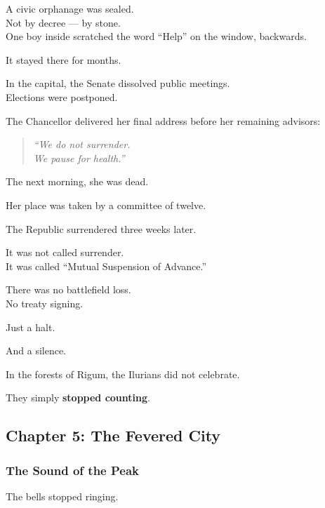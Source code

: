 \documentclass[12pt]{article}
\begin{document}
A civic orphanage was sealed.\\
Not by decree — by stone.\\
One boy inside scratched the word “Help” on the window, backwards.

It stayed there for months.

\vspace{1em}

In the capital, the Senate dissolved public meetings.\\
Elections were postponed.

The Chancellor delivered her final address before her remaining advisors:

\begin{quote}
\textit{“We do not surrender.}\\
\textit{We pause for health.”}
\end{quote}

The next morning, she was dead.

Her place was taken by a committee of twelve.

\vspace{1em}

The Republic surrendered three weeks later.

It was not called surrender.\\
It was called “Mutual Suspension of Advance.”

There was no battlefield loss.\\
No treaty signing.

Just a halt.

And a silence.

\vspace{1em}

In the forests of Rigum, the Ilurians did not celebrate.

They simply \textbf{stopped counting}.

\newpage

\subsection{Chapter 5: The Fevered City}

\vspace{.5in}

\subsubsection{The Sound of the Peak}

The bells stopped ringing.
\end{document}
